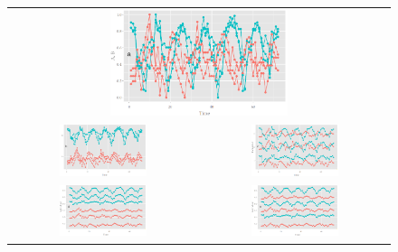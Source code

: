 \documentclass[12pt]{article}
\providecommand{\tabularnewline}{\\}
\begin{document}
\begin{center}
\begin{figure}[htp]
\begin{centering}
\begin{tabular}{cc}
\multicolumn{2}{c}{\includegraphics[width=0.48\textwidth]{graph/pipeline-14-1}}\tabularnewline
\includegraphics[width=0.48\textwidth]{graph/pipeline-14-2} & \includegraphics[width=0.48\textwidth]{graph/pipeline-14-3}\tabularnewline
\includegraphics[width=0.48\textwidth]{graph/pipeline-14-4} & \includegraphics[width=0.48\textwidth]{graph/pipeline-14-5}\tabularnewline
\end{tabular}
\end{centering}


\end{figure}
\end{center}
\end{document}
